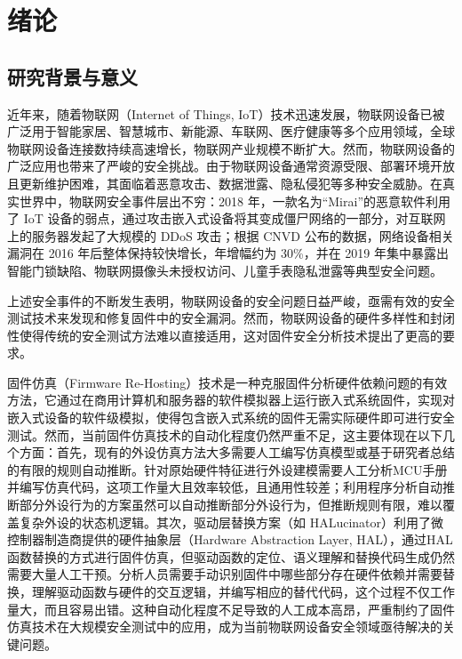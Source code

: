 \chapter{绪论}
\label{chap:intro}

\section{研究背景与意义}
\label{sec:bg}

近年来，随着物联网（Internet of Things, IoT）技术迅速发展，物联网设备已被广泛用于智能家居、智慧城市、新能源、车联网、医疗健康等多个应用领域，全球物联网设备连接数持续高速增长，物联网产业规模不断扩大。然而，物联网设备的广泛应用也带来了严峻的安全挑战\cite{yang2021iotsurvey}。由于物联网设备通常资源受限、部署环境开放且更新维护困难，其面临着恶意攻击、数据泄露、隐私侵犯等多种安全威胁。在真实世界中，物联网安全事件层出不穷：2018 年，一款名为“Mirai”的恶意软件\cite{mirai2018}利用了 IoT 设备的弱点，通过攻击嵌入式设备将其变成僵尸网络的一部分，对互联网上的服务器发起了大规模的 DDoS 攻击；根据 CNVD 公布的数据，网络设备相关漏洞在 2016 年后整体保持较快增长，年增幅约为 30\%，并在 2019 年集中暴露出智能门锁缺陷、物联网摄像头未授权访问、儿童手表隐私泄露等典型安全问题\cite{li2022iotfirmwaresurvey}。

上述安全事件的不断发生表明，物联网设备的安全问题日益严峻，亟需有效的安全测试技术来发现和修复固件中的安全漏洞。然而，物联网设备的硬件多样性和封闭性使得传统的安全测试方法难以直接适用，这对固件安全分析技术提出了更高的要求。

固件仿真（Firmware Re-Hosting）技术是一种克服固件分析硬件依赖问题的有效方法，它通过在商用计算机和服务器的软件模拟器上运行嵌入式系统固件，实现对嵌入式设备的软件级模拟，使得包含嵌入式系统的固件无需实际硬件即可进行安全测试\cite{liuhangtian2025iotfuzzer}。然而，当前固件仿真技术的自动化程度仍然严重不足，这主要体现在以下几个方面：首先，现有的外设仿真方法大多需要人工编写仿真模型或基于研究者总结的有限的规则自动推断。针对原始硬件特征进行外设建模需要人工分析MCU手册并编写仿真代码，这项工作量大且效率较低，且通用性较差；利用程序分析自动推断部分外设行为的方案虽然可以自动推断部分外设行为，但推断规则有限，难以覆盖复杂外设的状态机逻辑。其次，驱动层替换方案（如 HALucinator\cite{clements2020halucinator}）利用了微控制器制造商提供的硬件抽象层（Hardware Abstraction Layer, HAL），通过HAL函数替换的方式进行固件仿真，但驱动函数的定位、语义理解和替换代码生成仍然需要大量人工干预。分析人员需要手动识别固件中哪些部分存在硬件依赖并需要替换，理解驱动函数与硬件的交互逻辑，并编写相应的替代代码，这个过程不仅工作量大，而且容易出错。这种自动化程度不足导致的人工成本高昂，严重制约了固件仿真技术在大规模安全测试中的应用，成为当前物联网设备安全领域亟待解决的关键问题。


